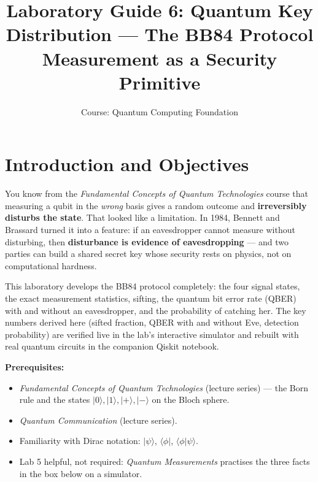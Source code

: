 \documentclass[a4paper,11pt]{article}
\title{\textbf{Laboratory Guide 6: Quantum Key Distribution --- The BB84 Protocol}\\
\large Measurement as a Security Primitive}
\author{Course: Quantum Computing Foundation}
\date{}
\providecommand{\ket}[1]{|#1\rangle}
\providecommand{\bra}[1]{\langle#1|}
\providecommand{\braket}[2]{\langle#1|#2\rangle}
\begin{document}
\maketitle

\section{Introduction and Objectives}

You know from the \textit{Fundamental Concepts of Quantum Technologies} course that
measuring a qubit in the \emph{wrong} basis gives a random outcome and \textbf{irreversibly disturbs the state}. That looked like a limitation.
In 1984, Bennett and Brassard turned it into a feature: if an eavesdropper cannot
measure without disturbing, then \textbf{disturbance is evidence of eavesdropping} ---
and two parties can build a shared secret key whose security rests on physics, not on
computational hardness.

This laboratory develops the BB84 protocol completely: the four signal states, the
exact measurement statistics, sifting, the quantum bit error rate (QBER) with and
without an eavesdropper, and the probability of catching her. The key numbers derived
here (sifted fraction, QBER with and without Eve, detection probability) are verified
live in the lab's interactive simulator and rebuilt with real quantum circuits in the
companion Qiskit notebook.

\vspace{0.3cm}
\noindent\textbf{Prerequisites:}
\begin{itemize}
    \item \textit{Fundamental Concepts of Quantum Technologies} (lecture series) --- the
          Born rule and the states $\ket{0}, \ket{1}, \ket{+}, \ket{-}$ on the Bloch sphere.
    \item \textit{Quantum Communication} (lecture series).
    \item Familiarity with Dirac notation: $\ket{\psi}$, $\bra{\phi}$, $\braket{\phi}{\psi}$.
    \item Lab 5 helpful, not required: \textit{Quantum Measurements} practises the three
          facts in the box below on a simulator.
\end{itemize}
\end{document}
